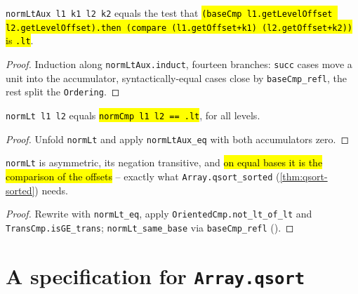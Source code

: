 \begin{lemma}
\label{thm:normlt-aux-eq}
\leanok
{}

 \texttt{normLtAux l1 k1 l2 k2} equals the test that \hl{\texttt{(baseCmp
l1.getLevelOffset l2.getLevelOffset).then (compare (l1.getOffset+k1) (l2.getOffset+k2))} is
\texttt{.lt}}.
\end{lemma}
\begin{proof}
\leanok
{} Induction along \texttt{normLtAux.induct}, fourteen branches: \texttt{succ} cases move a
unit into the accumulator, syntactically-equal cases close by \texttt{baseCmp\_refl}, the rest split
the \texttt{Ordering}.
\end{proof}

\begin{theorem}[\texttt{normLt} is \texttt{normCmp = lt}]
\label{thm:normlt-eq}
\leanok
{}
 \texttt{normLt l1 l2} equals \hl{\texttt{normCmp l1 l2 == .lt}}, for all levels.
\end{theorem}
\begin{proof}
\leanok
{} Unfold \texttt{normLt} and apply \texttt{normLtAux\_eq} with both accumulators zero.
\end{proof}

\begin{lemma}
\label{thm:normlt-swo}
\leanok
{}

 \texttt{normLt} is asymmetric, its negation transitive, and \hl{on equal bases it is
the comparison of the offsets} -- exactly what \texttt{Array.qsort\_sorted} (\ref{thm:qsort-sorted})
needs.
\end{lemma}
\begin{proof}
\leanok
{} Rewrite with \texttt{normLt\_eq}, apply \texttt{OrientedCmp.not\_lt\_of\_lt} and
\texttt{TransCmp.isGE\_trans}; \texttt{normLt\_same\_base} via \texttt{baseCmp\_refl}
().
\end{proof}

\section{A specification for \texttt{Array.qsort}}

